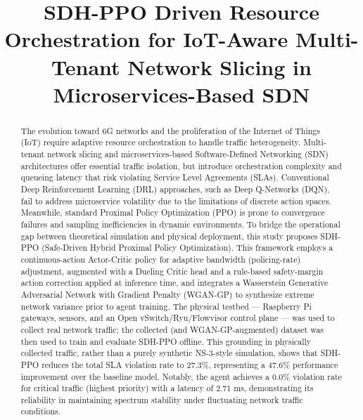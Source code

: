 \documentclass[conference]{IEEEtran}
\begin{document}
\title{SDH-PPO Driven Resource Orchestration for IoT-Aware Multi-Tenant Network Slicing in Microservices-Based SDN}

\author{
}

\maketitle

\begin{abstract}
The evolution toward 6G networks and the proliferation of the Internet of Things (IoT) require adaptive resource orchestration to handle traffic heterogeneity. Multi-tenant network slicing and microservices-based Software-Defined Networking (SDN) architectures offer essential traffic isolation, but introduce orchestration complexity and queueing latency that risk violating Service Level Agreements (SLAs). Conventional Deep Reinforcement Learning (DRL) approaches, such as Deep Q-Networks (DQN), fail to address microservice volatility due to the limitations of discrete action spaces. Meanwhile, standard Proximal Policy Optimization (PPO) is prone to convergence failures and sampling inefficiencies in dynamic environments. To bridge the operational gap between theoretical simulation and physical deployment, this study proposes SDH-PPO (Safe-Driven Hybrid Proximal Policy Optimization). This framework employs a continuous-action Actor-Critic policy for adaptive bandwidth (policing-rate) adjustment, augmented with a Dueling Critic head and a rule-based safety-margin action correction applied at inference time, and integrates a Wasserstein Generative Adversarial Network with Gradient Penalty (WGAN-GP) to synthesize extreme network variance prior to agent training. The physical testbed --- Raspberry Pi gateways, sensors, and an Open vSwitch/Ryu/Flowvisor control plane --- was used to collect real network traffic; the collected (and WGAN-GP-augmented) dataset was then used to train and evaluate SDH-PPO offline. This grounding in physically collected traffic, rather than a purely synthetic NS-3-style simulation, shows that SDH-PPO reduces the total SLA violation rate to 27.3\%, representing a 47.6\% performance improvement over the baseline model. Notably, the agent achieves a 0.0\% violation rate for critical traffic (highest priority) with a latency of 2.71 ms, demonstrating its reliability in maintaining spectrum stability under fluctuating network traffic conditions.
\end{abstract}
\end{document}
